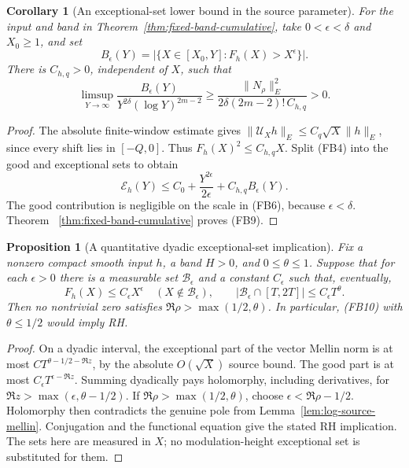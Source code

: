 \documentclass[11pt]{article}
\newtheorem{corollary}[theorem]{Corollary}
\newtheorem{proposition}[theorem]{Proposition}
\theoremstyle{remark}\newtheorem{remark}[theorem]{Remark}
\begin{document}
\begin{corollary}[An exceptional-set lower bound in the source parameter]
\label{cor:source-exception-measure}
For the input and band in Theorem~\ref{thm:fixed-band-cumulative},
take \(0<\epsilon<\delta\) and \(X_0\ge1\), and set
\[
 B_\epsilon(Y)=
 \big|\{X\in[X_0,Y]:F_h(X)>X^\epsilon\}\big|.
\]
There is \(C_{h,q}>0\), independent of \(X\), such that
\[
 \limsup_{Y\to\infty}
 \frac{B_\epsilon(Y)}{Y^{2\delta}(\log Y)^{2m-2}}
 \ge
 \frac{\|N_\rho\|_E^2}{2\delta(2m-2)!\,C_{h,q}}>0 .
 \tag{FB9}
\]
\end{corollary}
\begin{proof}
The absolute finite-window estimate gives
\(\|\mathcal U_Xh\|_E\le C_q\sqrt X\|h\|_E\), since every
shift lies in \([-Q,0]\). Thus \(F_h(X)^2\le C_{h,q}X\).
Split (FB4) into the good and exceptional sets to obtain
\[
 \mathcal E_h(Y)\le C_0+
       \frac{Y^{2\epsilon}}{2\epsilon}+C_{h,q}B_\epsilon(Y).
\]
The good contribution is negligible on the scale in (FB6),
because \(\epsilon<\delta\). Theorem~
\ref{thm:fixed-band-cumulative} proves (FB9).
\end{proof}

\begin{proposition}[A quantitative dyadic exceptional-set implication]
\label{prop:dyadic-source-exceptions}
Fix a nonzero compact smooth input \(h\), a band \(H>0\), and
\(0\le\theta\le1\). Suppose that for each \(\epsilon>0\)
there is a measurable set \(\mathcal B_\epsilon\) and a constant
\(C_\epsilon\) such that, eventually,
\[
 F_h(X)\le C_\epsilon X^\epsilon
       \quad(X\notin\mathcal B_\epsilon),\qquad
 |\mathcal B_\epsilon\cap[T,2T]|
       \le C_\epsilon T^\theta .
 \tag{FB10}
\]
Then no nontrivial zero satisfies
\(\Re\rho>\max(1/2,\theta)\). In particular, (FB10) with
\(\theta\le1/2\) would imply RH.
\end{proposition}
\begin{proof}
On a dyadic interval, the exceptional part of the vector
Mellin norm is at most
\(C T^{\theta-1/2-\Re z}\), by the absolute
\(O(\sqrt X)\) source bound. The good part is at most
\(C_\epsilon T^{\epsilon-\Re z}\).
Summing dyadically pays holomorphy, including derivatives,
for \(\Re z>\max(\epsilon,\theta-1/2)\).
If \(\Re\rho>\max(1/2,\theta)\), choose
\(\epsilon<\Re\rho-1/2\). Holomorphy then contradicts the
genuine pole from Lemma~\ref{lem:log-source-mellin}.
Conjugation and the functional equation give the stated RH
implication. The sets here are measured in \(X\); no
modulation-height exceptional set is substituted for them.
\end{proof}
\end{document}
